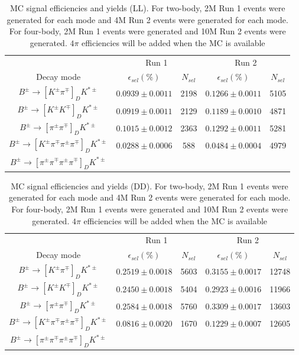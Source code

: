 \begin{table}[h]
\centering
\begin{tabular}{ccccc}
\hline
& \multicolumn{2}{c}{Run 1} & \multicolumn{2}{c}{Run 2} \\
Decay mode & $\epsilon_{sel}(\%)$ & $N_{sel}$ & $\epsilon_{sel}(\%)$ & $N_{sel}$ \\
\hline
$B^{\pm} \to [K^{\pm}\pi^{\mp}]_D K^{*\pm}$ & $0.0939 \pm 0.0011$ & 2198 & $0.1266 \pm 0.0011$ & 5105 \\
$B^{\pm} \to [K^{\pm}K^{\mp}]_D K^{*\pm}$ & $0.0919 \pm 0.0011$ & 2129 & $0.1189 \pm 0.0010$ & 4871 \\
$B^{\pm} \to [\pi^{\pm}\pi^{\mp}]_D K^{*\pm}$ & $0.1015 \pm 0.0012$ & 2363 & $0.1292 \pm 0.0011$ & 5281 \\
$B^{\pm} \to [K^{\pm}\pi^{\mp}\pi^{\pm}\pi^{\mp}]_D K^{*\pm}$ & $0.0288 \pm 0.0006$ & 588 & $0.0484 \pm 0.0004$ & 4979 \\
$B^{\pm} \to [\pi^{\pm}\pi^{\mp}\pi^{\pm}\pi^{\mp}]_D K^{*\pm}$ &  &  &  &  \\
\hline
\end{tabular}
\caption{MC signal efficiencies and yields (LL). For two-body, 2M Run 1 events were generated for each mode and 4M Run 2 events were generated for each mode. For four-body, 2M Run 1 events were generated and 10M Run 2 events were generated. {\color{red}$4\pi$ efficiencies will be added when the MC is available}}
\label{MCeffrun1}
\end{table}

\begin{table}[h]
\centering
\begin{tabular}{ccccc}
\hline
& \multicolumn{2}{c}{Run 1} & \multicolumn{2}{c}{Run 2} \\
Decay mode & $\epsilon_{sel}(\%)$ & $N_{sel}$ & $\epsilon_{sel}(\%)$ & $N_{sel}$ \\
\hline
$B^{\pm} \to [K^{\pm}\pi^{\mp}]_D K^{*\pm}$ & $0.2519 \pm 0.0018$ & 5603 & $0.3155 \pm 0.0017$ & 12748 \\
$B^{\pm} \to [K^{\pm}K^{\mp}]_D K^{*\pm}$ & $0.2450 \pm 0.0018$ & 5404 & $0.2923 \pm 0.0016$ & 11966 \\
$B^{\pm} \to [\pi^{\pm}\pi^{\mp}]_D K^{*\pm}$ & $0.2584 \pm 0.0018$ & 5760 & $0.3309 \pm 0.0017$ & 13603 \\
$B^{\pm} \to [K^{\pm}\pi^{\mp}\pi^{\pm}\pi^{\mp}]_D K^{*\pm}$ & $0.0816 \pm 0.0020$ & 1670 & $0.1229 \pm 0.0007$ & 12605 \\
$B^{\pm} \to [\pi^{\pm}\pi^{\mp}\pi^{\pm}\pi^{\mp}]_D K^{*\pm}$ &  &  &  &  \\
\hline
\end{tabular}
\caption{MC signal efficiencies and yields (DD). For two-body, 2M Run 1 events were generated for each mode and 4M Run 2 events were generated for each mode. For four-body, 2M Run 1 events were generated and 10M Run 2 events were generated. {\color{red}$4\pi$ efficiencies will be added when the MC is available}}
\label{MCeffrun2}
\end{table}


